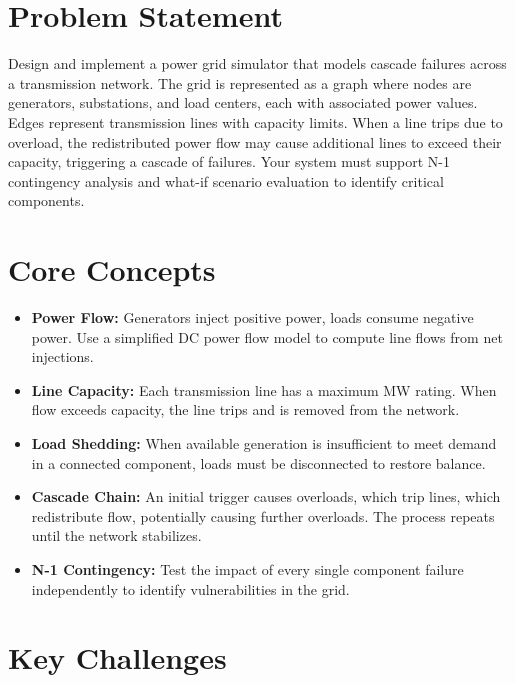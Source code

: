 \section{Problem Statement}

Design and implement a power grid simulator that models cascade failures across a transmission network. The grid is represented as a graph where nodes are generators, substations, and load centers, each with associated power values. Edges represent transmission lines with capacity limits. When a line trips due to overload, the redistributed power flow may cause additional lines to exceed their capacity, triggering a cascade of failures. Your system must support N-1 contingency analysis and what-if scenario evaluation to identify critical components.

\section{Core Concepts}

\begin{itemize}
  \item \textbf{Power Flow:} Generators inject positive power, loads consume negative power. Use a simplified DC power flow model to compute line flows from net injections.
  \item \textbf{Line Capacity:} Each transmission line has a maximum MW rating. When flow exceeds capacity, the line trips and is removed from the network.
  \item \textbf{Load Shedding:} When available generation is insufficient to meet demand in a connected component, loads must be disconnected to restore balance.
  \item \textbf{Cascade Chain:} An initial trigger causes overloads, which trip lines, which redistribute flow, potentially causing further overloads. The process repeats until the network stabilizes.
  \item \textbf{N-1 Contingency:} Test the impact of every single component failure independently to identify vulnerabilities in the grid.
\end{itemize}

\section{Key Challenges}

